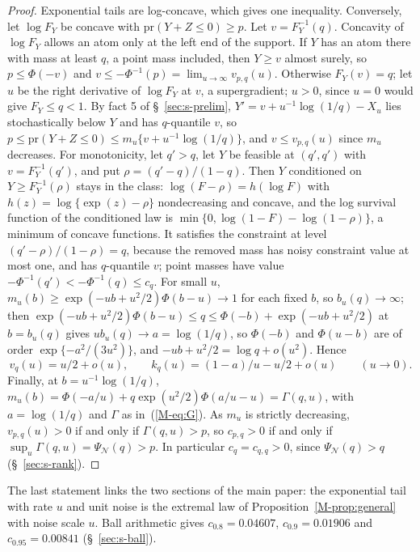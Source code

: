 \documentclass[12pt]{article}
\renewcommand{\_}{\usc\allowbreak}
\theoremstyle{definition}
\numberwithin{equation}{section}
\newcommand{\pr}{\mathrm{pr}}
\newcommand{\N}{\mathcal{N}}
\begin{document}
\begin{proof}
Exponential tails are log-concave, which gives one inequality. Conversely, let $\log F_Y$ be concave with $\pr(Y + Z \le 0) \ge p$. Let $v = F_Y^{-1}(q)$. Concavity of $\log F_Y$ allows an atom only at the left end of the support. If $Y$ has an atom there with mass at least $q$, a point mass included, then $Y \ge v$ almost surely, so $p \le \Phi(-v)$ and $v \le -\Phi^{-1}(p) = \lim_{u\to\infty}v_{p,q}(u)$. Otherwise $F_Y(v) = q$; let $u$ be the right derivative of $\log F_Y$ at $v$, a supergradient; $u > 0$, since $u = 0$ would give $F_Y \le q < 1$. By fact 5 of \S~\ref{sec:s-prelim}, $Y' = v + u^{-1}\log(1/q) - X_u$ lies stochastically below $Y$ and has $q$-quantile $v$, so $p \le \pr(Y + Z \le 0) \le m_u\{v + u^{-1}\log(1/q)\}$, and $v \le v_{p,q}(u)$ since $m_u$ decreases. For monotonicity, let $q' > q$, let $Y$ be feasible at $(q', q')$ with $v = F_Y^{-1}(q')$, and put $\rho = (q' - q)/(1 - q)$. Then $Y$ conditioned on $Y \ge F_Y^{-1}(\rho)$ stays in the class: $\log(F - \rho) = h(\log F)$ with $h(z) = \log\{\exp(z) - \rho\}$ nondecreasing and concave, and the log survival function of the conditioned law is $\min\{0, \log(1 - F) - \log(1 - \rho)\}$, a minimum of concave functions. It satisfies the constraint at level $(q' - \rho)/(1 - \rho) = q$, because the removed mass has noisy constraint value at most one, and has $q$-quantile $v$; point masses have value $-\Phi^{-1}(q') < -\Phi^{-1}(q) \le c_q$. For small $u$, $m_u(b) \ge \exp(-ub + u^2/2)\Phi(b - u) \to 1$ for each fixed $b$, so $b_u(q) \to \infty$; then $\exp(-ub + u^2/2)\Phi(b - u) \le q \le \Phi(-b) + \exp(-ub + u^2/2)$ at $b = b_u(q)$ gives $ub_u(q) \to a = \log(1/q)$, so $\Phi(-b)$ and $\Phi(u - b)$ are of order $\exp\{-a^2/(3u^2)\}$, and $-ub + u^2/2 = \log q + o(u^2)$. Hence
\begin{equation}\label{eq:smallu}
v_q(u) = u/2 + o(u), \qquad k_q(u) = (1 - a)/u - u/2 + o(u) \qquad (u \to 0).
\end{equation}
Finally, at $b = u^{-1}\log(1/q)$, $m_u(b) = \Phi(-a/u) + q\exp(u^2/2)\Phi(a/u - u) = \Gamma(q, u)$, with $a = \log(1/q)$ and $\Gamma$ as in~(\ref{M-eq:G}). As $m_u$ is strictly decreasing, $v_{p,q}(u) > 0$ if and only if $\Gamma(q, u) > p$, so $c_{p,q} > 0$ if and only if $\sup_u\Gamma(q, u) = \Psi_{\N}(q) > p$. In particular $c_q = c_{q,q} > 0$, since $\Psi_{\N}(q) > q$ (\S~\ref{sec:s-rank}).
\end{proof}

The last statement links the two sections of the main paper: the exponential tail with rate $u$ and unit noise is the extremal law of Proposition~\ref{M-prop:general} with noise scale $u$. Ball arithmetic gives $c_{0.8} = 0.04607$, $c_{0.9} = 0.01906$ and $c_{0.95} = 0.00841$ (\S~\ref{sec:s-ball}).
\end{document}
